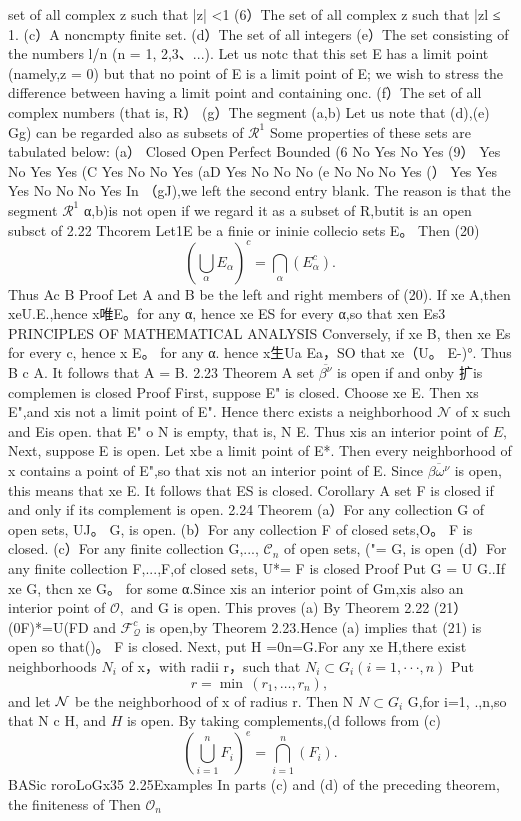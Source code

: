 set of all complex z such that |z| <1 (6）The set of all complex z such that |zl ≤ 1. (c）A noncmpty finite set. (d）The set of all integers (e）The set consisting of the numbers l/n (n = 1, 2,3、...). Let us notc that this set E has a limit point (namely,z = 0) but that no point of E is a limit point of E; we wish to stress the difference between having a limit point and containing onc. (f）The set of all complex numbers (that is, R） (g）The segment (a,b) Let us note that (d),(e) Gg) can be regarded also as subsets of $\textstyle{\mathcal{R}}^{1}$ Some properties of these sets are tabulated below: (a） Closed Open Perfect Bounded (6 No Yes No Yes (9） Yes No Yes Yes (C Yes No No Yes (aD Yes No No No (e No No No Yes (） Yes Yes Yes No No No Yes In （gJ),we left the second entry blank. The reason is that the segment $\textstyle{\mathcal{R}}^{1}$ α,b)is not open if we regard it as a subset of R,butit is an open subsct of 2.22 Thcorem Let1{E} be a finie or ininie collecio sets E。 Then (20) $$ \left(\bigcup_{\alpha}E_{\alpha}\right)^{c}=\bigcap_{\alpha}\left(E_{\alpha}^{c}\right). $$ Thus Ac B Proof Let A and B be the left and right members of (20). If xe A,then xeU.E.,hence x唯E。for any α, hence xe ES for every α,so that xen Es3 PRINCIPLES OF MATHEMATICAL ANALYSIS Conversely, if xe B, then xe Es for every c, hence x E。 for any α. hence x生Ua Ea，SO that xe（U。 E-)°. Thus B c A. It follows that A = B. 2.23 Theorem A set $\overline{{\beta^{\nu}}}$ is open if and onby 扩is complemen is closed Proof First, suppose E" is closed. Choose xe E. Then xs E",and xis not a limit point of E". Hence therc exists a neighborhood $\textstyle{\mathcal{N}}$ of x such and Eis open. that E" o N is empty, that is, N E. Thus xis an interior point of $\textstyle E,$ Next, suppose E is open. Let xbe a limit point of E*. Then every neighborhood of x contains a point of E",so that xis not an interior point of E. Since $\overline{{\beta\omega^{\nu}}}$ is open, this means that xe E. It follows that ES is closed. Corollary A set F is closed if and only if its complement is open. 2.24 Theorem (a）For any collection {G} of open sets, UJ。 G, is open. (b）For any collection {F} of closed sets,O。 F is closed. (c）For any finite collection G,..., ${\mathcal{C}}_{n}$ of open sets, ("= G, is open (d）For any finite collection F,...,F,of closed sets, U*= F is closed Proof Put G = U G..If xe G, thcn xe G。 for some α.Since xis an interior point of Gm,xis also an interior point of ${\mathcal{O}},$ and G is open. This proves (a) By Theorem 2.22 (21） (0F)*=U(FD and $\textstyle{\mathcal{F}}_{\mathcal{Q}}^{c}$ is open,by Theorem 2.23.Hence (a) implies that (21) is open so that()。 F is closed. Next, put H =0n=G.For any xe H,there exist neighborhoods $\textstyle{N_{i}}$ of x，with radii r，such that $N_{i}\subset G_{i}\left(i=1,\cdot\cdot\cdot,n\right)$ Put $$ r=\operatorname*{min}\,(r_{1},\ldots,r_{n}), $$ and let $\textstyle{\cal{N}}$ be the neighborhood of x of radius r. Then N $N\subset G_{i}$ G,for i=1, .,n,so that N c H, and $\textstyle{H}$ is open. By taking complements,(d follows from (c) $$ \left(\bigcup_{i=1}^{n}F_{i}\right)^{e}=\bigcap_{i=1}^{n}(F_{i}). $$BASic roroLoGx35 2.25Examples In parts (c) and (d) of the preceding theorem, the finiteness of Then ${\mathcal{O}}_{n}$ 